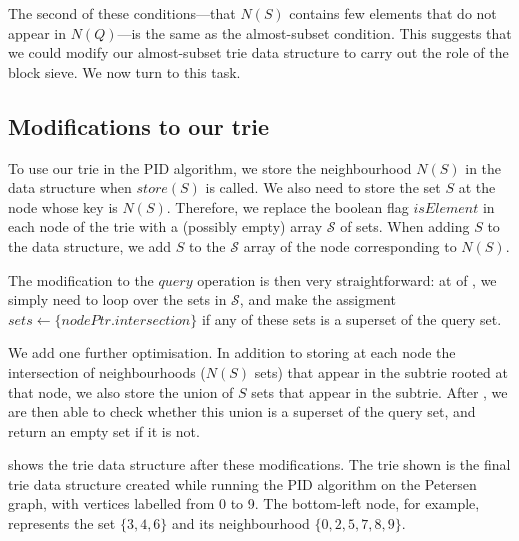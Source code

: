 The second of these conditions---that $N(S)$ contains few elements that do not
appear in $N(Q)$---is the same as the almost-subset condition.  This suggests
that we could modify our almost-subset trie data structure to carry out the
role of the block sieve.  We now turn to this task.

\subsection{Modifications to our trie}

To use our trie in the PID algorithm, we store the neighbourhood $N(S)$ in the
data structure when $\mathit{store}(S)$ is called.  We also need to store the set
$S$ at the node whose key is $N(S)$.  Therefore, we replace the boolean flag
$\mathit{isElement}$ in each node of the trie with a (possibly empty) array $\mathcal{S}$
of sets.  When adding $S$ to the data structure, we add $S$ to the $\mathcal{S}$
array of the node corresponding to $N(S)$.

The modification to the $\mathit{query}$ operation is then very
straightforward: at  of , we simply
need to loop over the sets in $\mathcal{S}$, and make the assigment
$\mathit{sets} \gets \{\mathit{nodePtr}.\mathit{intersection}\}$ if any of
these sets is a superset of the query set.

We add one further optimisation.  In addition to storing at each node the
intersection of neighbourhoods ($N(S)$ sets) that appear in the subtrie rooted
at that node, we also store the union of $S$ sets that appear in the subtrie.
After , we are then able to check whether
this union is a superset of the query set, and return an empty set if it is
not.

 shows the trie data structure after these modifications.
The trie shown is the final trie data structure created while running the PID
algorithm on the Petersen graph, with vertices labelled from 0 to 9.
The bottom-left node, for example, represents the set $\{3,4,6\}$ and its
neighbourhood $\{0,2,5,7,8,9\}$.

